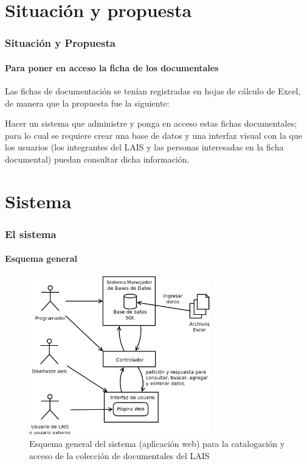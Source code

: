 \documentclass{beamer}
\begin{document}
\section{Situación y propuesta}
\begin{frame}
	\frametitle{Situación y Propuesta}
	\framesubtitle{Para poner en acceso la ficha de los documentales}
	
	Las fichas de documentación se tenían registradas en hojas de cálculo de Excel, de manera que la propuesta fue la siguiente:
	
	Hacer un sistema que administre y ponga en acceso estas fichas documentales; para lo cual se requiere crear una base de datos y una interfaz visual con la que los usuarios (los integrantes del LAIS y las personas interesadas en la ficha documental) puedan consultar dicha información.
\end{frame}

\section{Sistema}
\begin{frame}
	\frametitle{El sistema}
	\framesubtitle{Esquema general}
	\begin{figure}[H]
		\centering
		\includegraphics[width=0.7\textwidth]{EsquemaGeneral.png}
		\caption{Esquema general del sistema (aplicación web) para la catalogación y acceso de la colección de documentales del LAIS}
		\label{fig:esquema_general}
	\end{figure}
\end{frame}
\end{document}
